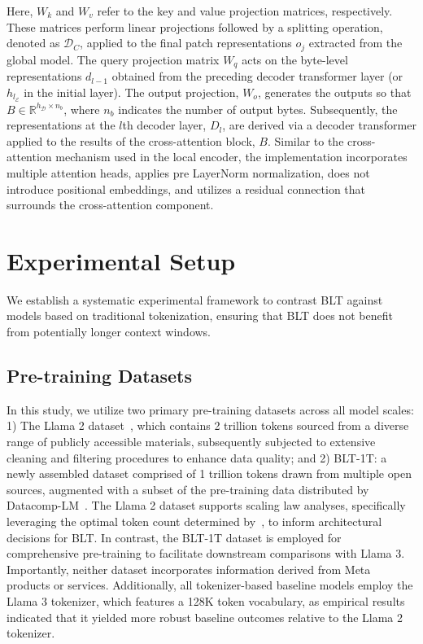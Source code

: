 Here, $W_k$ and $W_v$ refer to the key and value projection matrices, respectively. These matrices perform linear projections followed by a splitting operation, denoted as $\mathcal{D}_C$, applied to the final patch representations $o_j$ extracted from the global model. The query projection matrix $W_q$ acts on the byte-level representations $d_{l-1}$ obtained from the preceding decoder transformer layer (or $h_{l_{\mathcal{E}}}$ in the initial layer). The output projection, $W_o$, generates the outputs so that $B \in \mathbb{R}^{h_{\mathcal{D}} \times n_b}$, where $n_b$ indicates the number of output bytes. Subsequently, the representations at the $l$th decoder layer, $D_l$, are derived via a decoder transformer applied to the results of the cross-attention block, $B$. Similar to the cross-attention mechanism used in the local encoder, the implementation incorporates multiple attention heads, applies pre LayerNorm normalization, does not introduce positional embeddings, and utilizes a residual connection that surrounds the cross-attention component.

\section{Experimental Setup}
\label{section:experiments}
We establish a systematic experimental framework to contrast {\textsc BLT} against models based on traditional tokenization, ensuring that {\textsc BLT} does not benefit from potentially longer context windows.

\subsection{Pre-training Datasets} In this study, we utilize two primary pre-training datasets across all model scales: 1) The Llama 2 dataset~\citep{touvron2023llama}, which contains 2 trillion tokens sourced from a diverse range of publicly accessible materials, subsequently subjected to extensive cleaning and filtering procedures to enhance data quality; and 2) {\textsc BLT}-1T: a newly assembled dataset comprised of 1 trillion tokens drawn from multiple open sources, augmented with a subset of the pre-training data distributed by Datacomp-LM~\citep{li2024datacomp}. The Llama 2 dataset supports scaling law analyses, specifically leveraging the optimal token count determined by~\cite{dubey2024llama}, to inform architectural decisions for {\textsc BLT}. In contrast, the {\textsc BLT}-1T dataset is employed for comprehensive pre-training to facilitate downstream comparisons with Llama 3. Importantly, neither dataset incorporates information derived from Meta products or services. Additionally, all tokenizer-based baseline models employ the Llama 3 tokenizer, which features a 128K token vocabulary, as empirical results indicated that it yielded more robust baseline outcomes relative to the Llama 2 tokenizer.

